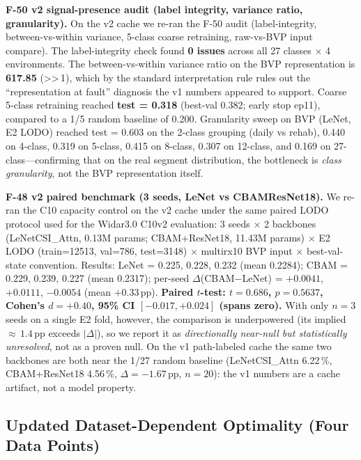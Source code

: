 \documentclass[11pt]{article}
\theoremstyle{definition}
\newcommand{\MDE}{\text{MDE}}
\begin{document}
\textbf{F-50 v2 signal-presence audit (label integrity, variance ratio, granularity).} On the v2 cache we re-ran the F-50 audit (label-integrity, between-vs-within variance, 5-class coarse retraining, raw-vs-BVP input compare). The label-integrity check found \textbf{0 issues} across all 27 classes $\times$ 4 environments. The between-vs-within variance ratio on the BVP representation is \textbf{617.85} (>>\,1), which by the standard interpretation rule rules out the ``representation at fault'' diagnosis the v1 numbers appeared to support. Coarse 5-class retraining reached \textbf{test = 0.318} (best-val 0.382; early stop ep11), compared to a 1/5 random baseline of 0.200. Granularity sweep on BVP (LeNet, E2 LODO) reached test = 0.603 on the 2-class grouping (daily vs rehab), 0.440 on 4-class, 0.319 on 5-class, 0.415 on 8-class, 0.307 on 12-class, and 0.169 on 27-class---confirming that on the real segment distribution, the bottleneck is \emph{class granularity}, not the BVP representation itself.

\textbf{F-48 v2 paired benchmark (3 seeds, LeNet vs CBAMResNet18).} We re-ran the C10 capacity control on the v2 cache under the same paired LODO protocol used for the Widar3.0 C10v2 evaluation: 3 seeds $\times$ 2 backbones (LeNetCSI\_Attn, 0.13M params; CBAM+ResNet18, 11.43M params) $\times$ E2 LODO (train=12513, val=786, test=3148) $\times$ multirx10 BVP input $\times$ best-val-state convention. Results: LeNet = 0.225, 0.228, 0.232 (mean 0.2284); CBAM = 0.229, 0.239, 0.227 (mean 0.2317); per-seed $\Delta$(CBAM$-$LeNet) = $+0.0041$, $+0.0111$, $-0.0054$ (mean $+0.33$\,pp). \textbf{Paired $t$-test: $t = 0.686$, $p = 0.5637$, Cohen's $d = +0.40$, 95\% CI $[-0.017, +0.024]$ (spans zero).} With only $n = 3$ seeds on a single E2 fold, however, the comparison is underpowered (its implied \MDE{} ${\approx}\,1.4$\,pp exceeds $|\Delta|$), so we report it as \emph{directionally near-null but statistically unresolved}, not as a proven null. On the v1 path-labeled cache the same two backbones are both near the 1/27 random baseline (LeNetCSI\_Attn 6.22\,\%, CBAM+ResNet18 4.56\,\%, $\Delta = -1.67$\,pp, $n = 20$): the v1 numbers are a cache artifact, not a model property.

\subsection{Updated Dataset-Dependent Optimality (Four Data Points)}
\end{document}
